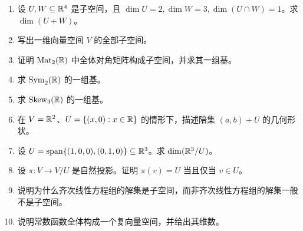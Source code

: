 \begin{enumerate}[label=\arabic*., leftmargin=2.5em]
  \item \basic 设 $U,W\subseteq \mathbb{R}^4$ 是子空间，且 $\dim U=2,\dim W=3,\dim(U\cap W)=1$。求 $\dim(U+W)$。
  \item \basic 写出一维向量空间 $V$ 的全部子空间。
  \item \basic 证明 $\mathrm{Mat}_2(\mathbb{R})$ 中全体对角矩阵构成子空间，并求其一组基。
  \item \basic 求 $\mathrm{Sym}_2(\mathbb{R})$ 的一组基。
  \item \basic 求 $\mathrm{Skew}_3(\mathbb{R})$ 的一组基。
  \item \basic 在 $V=\mathbb{R}^2$、$U=\{(x,0):x\in\mathbb{R}\}$ 的情形下，描述陪集 $(a,b)+U$ 的几何形状。
  \item \basic 设 $U=\mathrm{span}\{(1,0,0),(0,1,0)\}\subseteq \mathbb{R}^3$。求 $\dim(\mathbb{R}^3/U)$。
  \item \basic 设 $\pi:V\to V/U$ 是自然投影。证明 $\pi(v)=U$ 当且仅当 $v\in U$。
  \item \basic 说明为什么齐次线性方程组的解集是子空间，而非齐次线性方程组的解集一般不是子空间。
  \item \basic 说明常数函数全体构成一个复向量空间，并给出其维数。
\end{enumerate}

